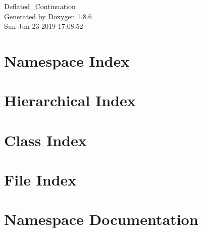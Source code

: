 \documentclass[twoside]{book}
\newcommand{\clearemptydoublepage}{%
  \newpage{\pagestyle{empty}\cleardoublepage}%
}
\begin{document}
\hypersetup{pageanchor=false}
\begin{titlepage}
\vspace*{7cm}
\begin{center}%
{\Large Deflated\-\_\-\-Continuation }\\
\vspace*{1cm}
{\large Generated by Doxygen 1.8.6}\\
\vspace*{0.5cm}
{\small Sun Jun 23 2019 17:08:52}\\
\end{center}
\end{titlepage}
\clearemptydoublepage
\tableofcontents
\clearemptydoublepage
{}
\hypersetup{pageanchor=true}

\chapter{Namespace Index}

\chapter{Hierarchical Index}

\chapter{Class Index}

\chapter{File Index}

\chapter{Namespace Documentation}






















\end{document}
